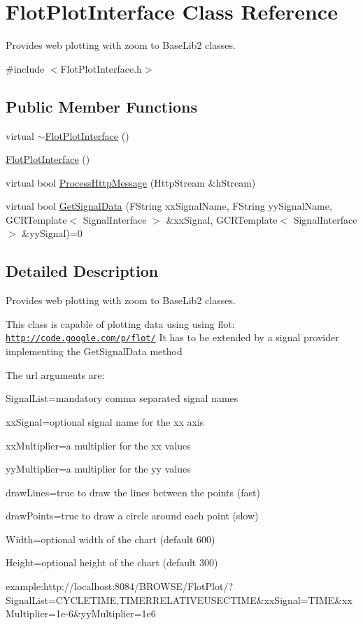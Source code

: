 \hypertarget{classFlotPlotInterface}{
\section{FlotPlotInterface Class Reference}
\label{classFlotPlotInterface}
}


Provides web plotting with zoom to BaseLib2 classes.  




{\ttfamily \#include $<$FlotPlotInterface.h$>$}

\subsection*{Public Member Functions}
\begin{DoxyCompactItemize}
\item 
virtual \hyperlink{classFlotPlotInterface_a1abecd17218f3063cea03fc7579d7bdf}{$\sim$FlotPlotInterface} ()
\item 
\hyperlink{classFlotPlotInterface_ae63ae90db79db792b5f9e96d81f0ad05}{FlotPlotInterface} ()
\item 
virtual bool \hyperlink{classFlotPlotInterface_aff4a6245a440da563bc32175646b4dca}{ProcessHttpMessage} (HttpStream \&hStream)
\item 
virtual bool \hyperlink{classFlotPlotInterface_a6eda02b2d2919a2e7e23c594ddee68d2}{GetSignalData} (FString xxSignalName, FString yySignalName, GCRTemplate$<$ SignalInterface $>$ \&xxSignal, GCRTemplate$<$ SignalInterface $>$ \&yySignal)=0
\end{DoxyCompactItemize}


\subsection{Detailed Description}
Provides web plotting with zoom to BaseLib2 classes. 

This class is capable of plotting data using using flot: \href{http://code.google.com/p/flot/}{\tt http://code.google.com/p/flot/} It has to be extended by a signal provider implementing the GetSignalData method

The url arguments are:\par
 SignalList=mandatory comma separated signal names\par
 xxSignal=optional signal name for the xx axis\par
 xxMultiplier=a multiplier for the xx values\par
 yyMultiplier=a multiplier for the yy values\par
 drawLines=true to draw the lines between the points (fast)\par
 drawPoints=true to draw a circle around each point (slow)\par
 Width=optional width of the chart (default 600)\par
 Height=optional height of the chart (default 300)\par
 example:http://localhost:8084/BROWSE/FlotPlot/?SignalList=CYCLETIME,TIMERRELATIVEUSECTIME\&xxSignal=TIME\&xxMultiplier=1e-\/6\&yyMultiplier=1e6\par


